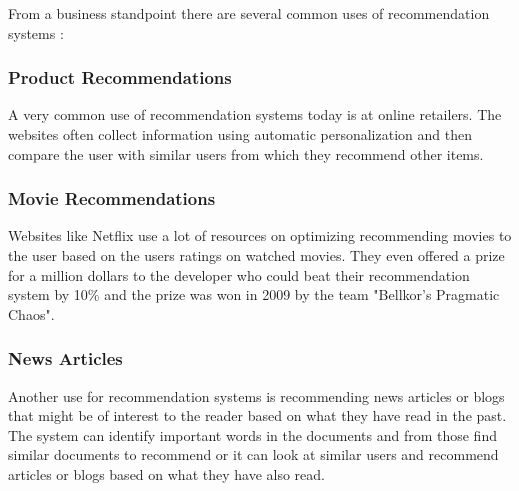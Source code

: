 From a business standpoint there are several common uses of recommendation systems \cite{MoMDatasets}:

\subsubsection{Product Recommendations}


A very common use of recommendation systems today is at online retailers. The websites often collect information using automatic personalization and then compare the user with similar users from which they recommend other items.


\subsubsection{Movie Recommendations}


Websites like Netflix use a lot of resources on optimizing recommending movies to the user based on the users ratings on watched movies. They even offered a prize for a million dollars to the developer who could beat their recommendation system by 10\% and the prize was won in 2009 by the team "Bellkor's Pragmatic Chaos".


\subsubsection{News Articles}


Another use for recommendation systems is recommending news articles or blogs that might be of interest to the reader based on what they have read in the past. The system can identify important words in the documents and from those find similar documents to recommend or it can look at similar users and recommend articles or blogs based on what they have also read.    
